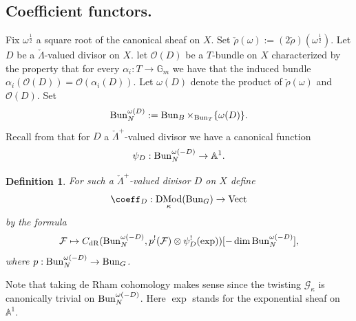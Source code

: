 \documentclass[9pt]{amsart}
\newcommand{\bA}{{\mathbb A}}
\newcommand{\bG}{{\mathbb G}}
\newcommand{\cF}{{\mathcal F}}
\newcommand{\cG}{{\mathcal G}}
\newcommand{\cO}{{\mathcal O}}
\DeclareMathOperator{\Vect}{{Vect}}
\newtheorem{df}[subsubsection]{Definition}
\numberwithin{equation}{section}
\newcommand{\dR}{\mathrm{dR}}
\DeclareMathOperator{\D}{{DMod}}
\begin{document}
	\subsection{Coefficient functors.}\label{coeffs}
	Fix $\omega^{\frac{1}{2}}$ a square root of the canonical sheaf on $X$. Set $\check{\rho}(\omega):= (2\check{\rho})(\omega^{\frac{1}{2}})$. Let $D$ be a $\check{\Lambda}$-valued divisor on $X$. let $\cO(D)$ be a $T$-bundle on $X$ characterized by the property that for every $\alpha_i: T \rightarrow \bG_m$ we have that the induced bundle $\alpha_i(\cO(D))= \cO(\alpha_i(D))$. Let $\omega(D)$ denote the product of $\check{\rho}(\omega)$ and $\cO(D)$. Set $$\operatorname{{Bun}}_N^{\omega(D)}:= \operatorname{{Bun}}_B \times_{\operatorname{{Bun}}_T} \{\omega(D)\}.$$
	Recall from \cite[4.1.3]{FGV} that for $D$ a $\check{\Lambda}^+$-valued divisor we have a canonical function
	$$\psi_D: \Bun_N^{\omega(-D)} \rightarrow \bA^1.$$
	\begin{df}
		For such  a $\check{\Lambda}^+$-valued divisor $D$ on $X$ define $$\coeff_D: \D_{\kappa}(\Bun_G) \rightarrow \Vect$$
		by the formula
		$$\cF \mapsto C_{\dR}(\Bun_N^{\omega(-D)} , p^!(\cF) \otimes \psi_D^!(\operatorname{exp}))[-\dim \Bun_N^{\omega(-D)}],$$
		where $p: \operatorname{{Bun}}_N^{\omega(-D)} \rightarrow \operatorname{{Bun}}_G$.
	\end{df}
	Note that taking de Rham cohomology makes sense since the twisting $\cG_{\kappa}$ is canonically trivial on $\operatorname{{Bun}}_N^{\omega(-D)}$. Here $\operatorname{exp}$ stands for the exponential sheaf on $\bA^1$.
	
\end{document}
